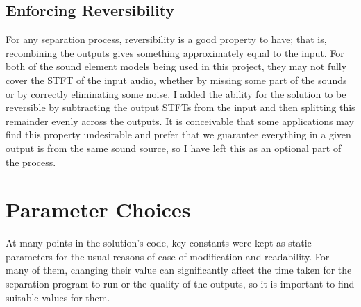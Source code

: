 \documentclass[12pt,a4paper,twoside,openright]{report}
\begin{document}
\subsection{Enforcing Reversibility}

For any separation process, reversibility is a good property to have; that is, recombining the outputs gives something approximately equal to the input. For both of the sound element models being used in this project, they may not fully cover the STFT of the input audio, whether by missing some part of the sounds or by correctly eliminating some noise. I added the ability for the solution to be reversible by subtracting the output STFTs from the input and then splitting this remainder evenly across the outputs. It is conceivable that some applications may find this property undesirable and prefer that we guarantee everything in a given output is from the same sound source, so I have left this as an optional part of the process.

\section{Parameter Choices}

At many points in the solution's code, key constants were kept as static parameters for the usual reasons of ease of modification and readability. For many of them, changing their value can significantly affect the time taken for the separation program to run or the quality of the outputs, so it is important to find suitable values for them.
\end{document}
